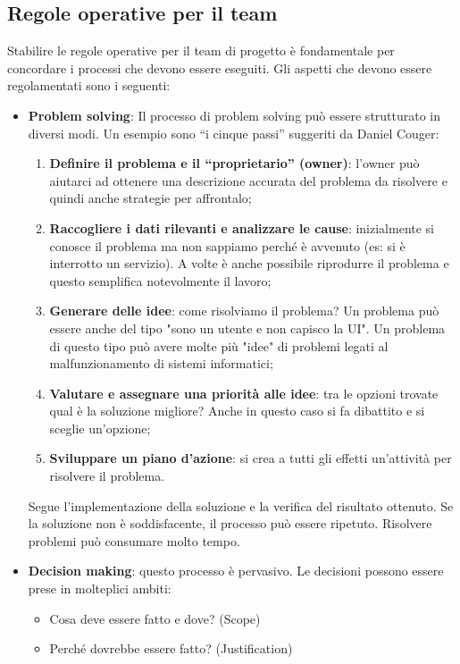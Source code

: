 \subsection{Regole operative per il team}
Stabilire le regole operative per il team di progetto è fondamentale per concordare i processi che devono essere eseguiti.\newline
Gli aspetti che devono essere regolamentati sono i seguenti:
\begin{itemize}
	\item \textbf{Problem solving}: Il processo di problem solving può essere strutturato in diversi modi. Un esempio sono “i cinque passi” suggeriti da Daniel Couger:
	\begin{enumerate}
		\item \textbf{Definire il problema e il “proprietario” (owner)}: l'owner può aiutarci ad ottenere una descrizione accurata del problema da risolvere e quindi anche strategie per affrontalo;
		\item \textbf{Raccogliere i dati rilevanti e analizzare le cause}: inizialmente si conosce il problema ma non sappiamo perché è avvenuto (es: si è interrotto un servizio). A volte è anche possibile riprodurre il problema e questo semplifica notevolmente il lavoro;
		\item \textbf{Generare delle idee}: come risolviamo il problema? Un problema può essere anche del tipo "sono un utente e non capisco la UI". Un problema di questo tipo può avere molte più "idee" di problemi legati al malfunzionamento di sistemi informatici;
		\item \textbf{Valutare e assegnare una priorità alle idee}: tra le opzioni trovate qual è la soluzione migliore? Anche in questo caso si fa dibattito e si sceglie un'opzione;
		\item \textbf{Sviluppare un piano d’azione}: si crea a tutti gli effetti un'attività per risolvere il problema.
	\end{enumerate}
	Segue l’implementazione della soluzione e la verifica del risultato ottenuto.
	Se la soluzione non è soddisfacente, il processo può essere ripetuto. Risolvere problemi può consumare molto tempo.
	\item \textbf{Decision making}: questo processo è pervasivo. Le decisioni possono essere prese in molteplici ambiti:
	\begin{itemize}
		\item Cosa deve essere fatto e dove? (Scope)
		\item Perché dovrebbe essere fatto? (Justification)

\end{itemize}
\end{itemize}
